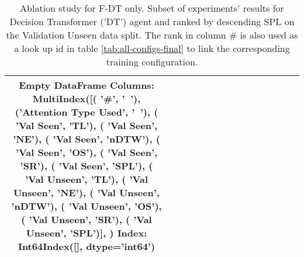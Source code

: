 \begin{table}
\centering
\caption{\label{tab:dt_full_dt_ablation}Ablation study for F-DT only. Subset of experiments' results for Decision Transformer ('DT') agent and ranked by descending SPL on the Validation Unseen data split. The rank in column \# is also used as a look up id in table \ref{tab:all-configs-final} to link the corresponding training configuration.}
\begin{tabular}{@{\hskip3pt}c@{\hskip3pt}c@{\hskip3pt}c@{\hskip3pt}c@{\hskip3pt}c@{\hskip3pt}c@{\hskip3pt}c@{\hskip3pt}c@{\hskip3pt}c@{\hskip3pt}c@{\hskip3pt}c@{\hskip3pt}c@{\hskip3pt}c@{\hskip3pt}c@{\hskip3pt}c}
\toprule
Empty DataFrame
Columns: MultiIndex([(                 '\textbf{\#}',    '\textbf{~}'),
            ('\textbf{Attention Type Used}',    '\textbf{~}'),
            (           '\textbf{Val Seen}',   '\textbf{TL}'),
            (           '\textbf{Val Seen}',   '\textbf{NE}'),
            (           '\textbf{Val Seen}', '\textbf{nDTW}'),
            (           '\textbf{Val Seen}',   '\textbf{OS}'),
            (           '\textbf{Val Seen}',   '\textbf{SR}'),
            (           '\textbf{Val Seen}',  '\textbf{SPL}'),
            (         '\textbf{Val Unseen}',   '\textbf{TL}'),
            (         '\textbf{Val Unseen}',   '\textbf{NE}'),
            (         '\textbf{Val Unseen}', '\textbf{nDTW}'),
            (         '\textbf{Val Unseen}',   '\textbf{OS}'),
            (         '\textbf{Val Unseen}',   '\textbf{SR}'),
            (         '\textbf{Val Unseen}',  '\textbf{SPL}')],
           )
Index: Int64Index([], dtype='int64') \\
\bottomrule
\end{tabular}
\end{table}
